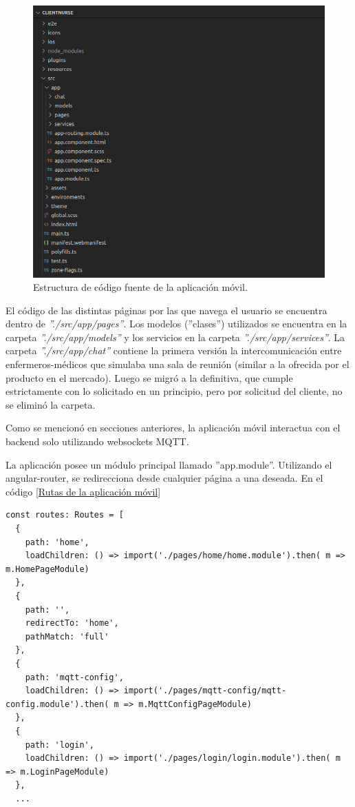 \begin{figure}[ht]
	\centering
	\includegraphics[scale=.60]{./Figures/app/estructura-app.png}
	\caption{ Estructura de código fuente de la aplicación móvil.}
	\label{fig: Estructura de código fuente de la aplicación móvil.}
\end{figure} 

El código de las distintas páginas por las que navega el usuario se encuentra dentro de \textit{''./src/app/pages''}. Los modelos (''clases'') utilizados se encuentra en la carpeta \textit{''./src/app/models''} y los servicios en la carpeta \textit{''./src/app/services''}. La carpeta \textit{''./src/app/chat''} contiene la primera versión la intercomunicación entre enfermeros-médicos que simulaba una sala de reunión (similar a la ofrecida por el producto en el mercado). Luego se migró a la definitiva, que cumple estrictamente con lo solicitado en un principio, pero por solicitud del cliente, no se eliminó la carpeta.

Como se mencionó en secciones anteriores, la aplicación móvil interactua con el backend solo utilizando websockets MQTT.

La aplicación posee un módulo principal llamado ''app.module''. Utilizando el angular-router, se redirecciona desde cualquier página a una deseada. En el código \ref{Rutas de la aplicación móvil}

\begin{lstlisting}[caption=  Fragmento de las rutas de la aplicación móvil]
const routes: Routes = [
  {
    path: 'home',
    loadChildren: () => import('./pages/home/home.module').then( m => m.HomePageModule)
  },
  {
    path: '',
    redirectTo: 'home',
    pathMatch: 'full'
  },
  {
    path: 'mqtt-config',
    loadChildren: () => import('./pages/mqtt-config/mqtt-config.module').then( m => m.MqttConfigPageModule)
  },
  {
    path: 'login',
    loadChildren: () => import('./pages/login/login.module').then( m => m.LoginPageModule)
  },
  ...

\end{lstlisting} 


